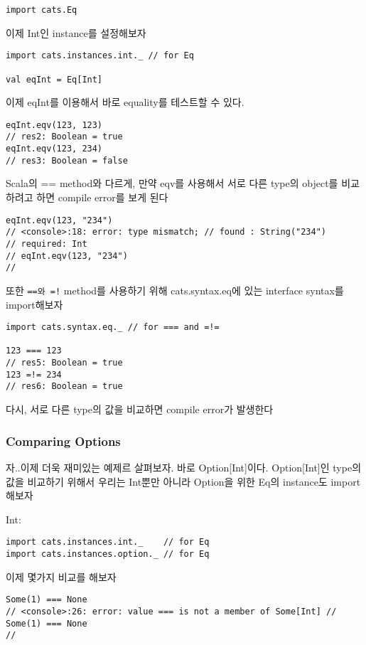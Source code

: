 \documentclass[a4paper]{article}
\begin{document}
\begin{verbatim}
import cats.Eq
\end{verbatim}

이제 Int인 instance를 설정해보자

\begin{verbatim}
import cats.instances.int._ // for Eq

val eqInt = Eq[Int]
\end{verbatim}

이제 eqInt를 이용해서 바로 equality를 테스트할 수 있다.

\begin{verbatim}
eqInt.eqv(123, 123)
// res2: Boolean = true
eqInt.eqv(123, 234)
// res3: Boolean = false
\end{verbatim}

Scala의 == method와 다르게, 만약 eqv를 사용해서 서로 다른 type의 object를 비교하려고 하면 compile error를 보게 된다

\begin{verbatim}
eqInt.eqv(123, "234")
// <console>:18: error: type mismatch; // found : String("234")
// required: Int
// eqInt.eqv(123, "234")
//
\end{verbatim}

또한 \texttt{==와 =!} method를 사용하기 위해 cats.syntax.eq에 있는 interface syntax를 import해보자

\begin{verbatim}
import cats.syntax.eq._ // for === and =!=

123 === 123
// res5: Boolean = true
123 =!= 234
// res6: Boolean = true
\end{verbatim}

다시, 서로 다른 type의 값을 비교하면 compile error가 발생한다

\subsubsection{Comparing Options}
\label{sec:orgca875f2}
자..이제 더욱 재미있는 예제르 살펴보자. 바로 Option[Int]이다. Option[Int]인 type의 값을 비교하기 위해서 우리는 Int뿐만 아니라 Option을 위한 Eq의 instance도 import해보자

Int:
\begin{verbatim}
import cats.instances.int._    // for Eq
import cats.instances.option._ // for Eq
\end{verbatim}

이제 몇가지 비교를 해보자

\begin{verbatim}
Some(1) === None
// <console>:26: error: value === is not a member of Some[Int] // Some(1) === None
//
\end{verbatim}
\end{document}
